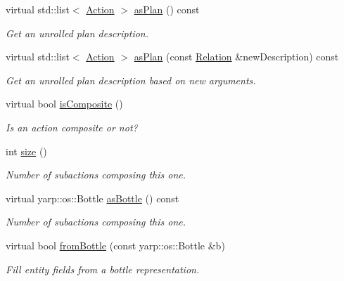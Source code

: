 \begin{DoxyCompactItemize}
virtual std\+::list$<$ \hyperlink{group__icubclient__representations_classicubclient_1_1Action}{Action} $>$ \hyperlink{group__icubclient__representations_a1a840d759c2b5448792307394c3fdf4a}{as\+Plan} () const
\begin{DoxyCompactList}\small\item\em Get an unrolled plan description. \end{DoxyCompactList}\item 
virtual std\+::list$<$ \hyperlink{group__icubclient__representations_classicubclient_1_1Action}{Action} $>$ \hyperlink{group__icubclient__representations_a260238c3bc643b27a5f6f5001ebf1444}{as\+Plan} (const \hyperlink{group__icubclient__representations_classicubclient_1_1Relation}{Relation} \&new\+Description) const
\begin{DoxyCompactList}\small\item\em Get an unrolled plan description based on new arguments. \end{DoxyCompactList}\item 
virtual bool \hyperlink{group__icubclient__representations_a082ed3f3c38800ae49ab9d8ef991de8b}{is\+Composite} ()
\begin{DoxyCompactList}\small\item\em Is an action composite or not? \end{DoxyCompactList}\item 
int \hyperlink{group__icubclient__representations_a6f97f36aa3e072445f24774c2e0d9dcd}{size} ()
\begin{DoxyCompactList}\small\item\em Number of subactions composing this one. \end{DoxyCompactList}\item 
virtual yarp\+::os\+::\+Bottle \hyperlink{group__icubclient__representations_a55fccb7922381a3d9a6657af902368b9}{as\+Bottle} () const
\begin{DoxyCompactList}\small\item\em Number of subactions composing this one. \end{DoxyCompactList}\item 
virtual bool \hyperlink{group__icubclient__representations_a5bde40cd7f11badb7d61b70e51fe18c0}{from\+Bottle} (const yarp\+::os\+::\+Bottle \&b)
\begin{DoxyCompactList}\small\item\em Fill entity fields from a bottle representation. \end{DoxyCompactList}\item 

\end{DoxyCompactItemize}
